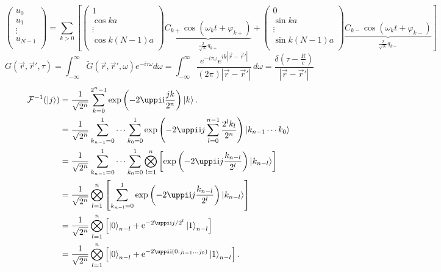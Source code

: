 \documentclass[english,log-declarations=false]{article}
\begin{document}
\[\left( \begin{matrix}
{{u}_{0}}  \\
{{u}_{1}}  \\
\vdots   \\
{{u}_{N-1}}  \\
\end{matrix} \right)=\sum\limits_{k>0}{\left[ \left( \begin{matrix}
	1  \\
	\cos ka  \\
	\vdots   \\
	\cos k\left( N-1 \right)a  \\
	\end{matrix} \right)\underbrace{{{C}_{k+}}\cos \left( {{\omega }_{k}}t+{{\varphi }_{k+}} \right)}_{\frac{2}{\sqrt{N}}{{q}_{k+}}}+\left( \begin{matrix}
	0  \\
	\sin ka  \\
	\vdots   \\
	\sin k\left( N-1 \right)a  \\
	\end{matrix} \right)\underbrace{{{C}_{k-}}\cos \left( {{\omega }_{k}}t+{{\varphi }_{k-}} \right)}_{\frac{2}{\sqrt{N}}{{q}_{k-}}} \right]}\]
\[G(\vec{r},{\vec{r}}',\tau )=\int _{-\infty }^{\infty }\tilde{G}(\vec{r},{\vec{r}}',\omega )e^{-i \tau  \omega }d\omega=\int_{-\infty }^{\infty } \frac{e^{-i \tau  \omega } e^{i k |\vec{r}-{\vec{r}}'| }}{(2 \pi ) |\vec{r}-{\vec{r}}'| } \, d\omega=\frac{\delta  \left(\tau -\frac{R}{c}\right)}{|\vec{r}-{\vec{r}}'| }\]
\[
\begin{split}	
\mathcal{F}^{-1}(\ket{j})
&{}=\frac{1}{\sqrt{2^n}}\sum_{k=0}^{2^n-1}\exp\left(-2\uppi \ii \frac{jk}{2^n}\right)\ket{k}.\\
&{}=\frac{1}{\sqrt{2^n}}\sum_{k_{n-1}=0}^1\cdots\sum_{k_{0}=0}^1\exp\left(-2\uppi \ii j\sum_{l=0}^{n-1}\frac{2^l k_l}{2^n}\right)\ket{k_{n-1}\cdots k_0}\\
&{}=\frac{1}{\sqrt{2^n}}\sum_{k_{n-1}=0}^1\cdots\sum_{k_{0}=0}^1\bigotimes_{l=1}^n\left[\exp\left(-2\uppi \ii j\frac{k_{n-l}}{2^l}\right)\ket{k_{n-l}}\right]\\
&{}=\frac{1}{\sqrt{2^n}}\bigotimes_{l=1}^n\left[\sum_{k_{n-l}=0}^1\exp\left(-2\uppi \ii j\frac{k_{n-l}}{2^l}\right)\ket{k_{n-l}}\right]\\
&{}=\frac{1}{\sqrt{2^n}}\bigotimes_{l=1}^n\left[\ket{0}_{n-l}+\ee^{-2\uppi \ii j /2^l}\ket{1}_{n-l}\right]\\
&{}=\frac{1}{\sqrt{2^n}}\bigotimes_{l=1}^n\left[\ket{0}_{n-l}+\ee^{-2\uppi \ii ({0.j_{l-1}\ldots j_0})}\ket{1}_{n-l}\right].
\end{split}
\]
\end{document}
